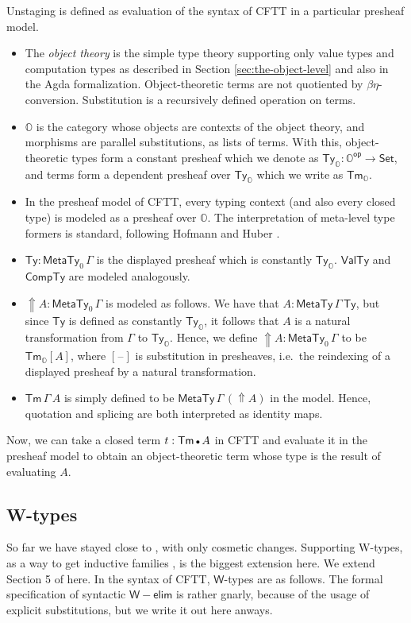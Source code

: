 \documentclass[acmsmall,screen,review,anonymous]{acmart}
\newcommand{\msf}[1]{{\mathsf{#1}}}
\newcommand{\mbb}[1]{\mathbb{#1}}
\newcommand{\emptycon}{\scaleobj{.75}\bullet}
\newcommand{\Tyo}{\msf{Ty}_{\mbbo}}
\newcommand{\Tmo}{\msf{Tm}_{\mbbo}}
\newcommand{\mbbo}{\mbb{O}}
\newcommand{\vW}{\mathsf{W}}
\newcommand{\Set}{\msf{Set}}
\newcommand{\Tm}{\msf{Tm}}
\newcommand{\Lift}{{\Uparrow}}
\newcommand{\MTy}{\msf{MetaTy}}
\newcommand{\VTy}{\msf{ValTy}}
\newcommand{\Ty}{\msf{Ty}}
\newcommand{\CTy}{\msf{CompTy}}
\newcommand{\blank}{{\mathord{\hspace{1pt}\text{--}\hspace{1pt}}}}
\theoremstyle{remark}
\begin{document}
Unstaging is defined as evaluation of the syntax of CFTT in a particular
presheaf model.
\begin{itemize}
  \item The \emph{object theory} is the simple type theory supporting only value
    types and computation types as described in Section
    \ref{sec:the-object-level} and also in the Agda
    formalization. Object-theoretic terms are not quotiented by
    $\beta\eta$-conversion. Substitution is a recursively defined operation on
    terms.
  \item $\mbbo$ is the category whose objects are contexts of the object theory,
    and morphisms are parallel substitutions, as lists of terms. With this,
    object-theoretic types form a constant presheaf which we denote
    as $\Tyo : \mbbo^{\msf{op}} \to \Set$, and terms form a dependent presheaf over $\Tyo$ which we write as
    $\Tmo$.
  \item
  In the presheaf model of CFTT, every typing context (and also every closed
  type) is modeled as a presheaf over $\mbbo$. The interpretation of meta-level
  type formers is standard, following Hofmann \cite{Hofmann97syntaxand} and
  Huber \cite{huber-thesis}.
\item $\Ty : \MTy_0\,\Gamma$ is the displayed presheaf which is constantly
  $\Tyo$. $\VTy$ and $\CTy$ are modeled analogously.
\item $\Lift A : \MTy_0\,\Gamma$ is modeled as follows. We have that $A :
  \MTy\,\Gamma\,\Ty$, but since $\Ty$ is defined as constantly $\Tyo$, it
  follows that $A$ is a natural transformation from $\Gamma$ to $\Tyo$. Hence,
  we define $\Lift A : \MTy_0\,\Gamma$ to be $\Tmo[A]$, where $[\blank]$ is
  substitution in presheaves, i.e.\ the reindexing of a displayed presheaf by a
  natural transformation.
\item
  $\Tm\,\Gamma\,A$ is simply defined to be $\MTy\,\Gamma\,(\Lift A)$ in the model. Hence,
  quotation and splicing are both interpreted as identity maps.
\end{itemize}
Now, we can take a closed term $t : \Tm\,\emptycon\,A$ in CFTT and evaluate it
in the presheaf model to obtain an object-theoretic term whose type is the
result of evaluating $A$.

\subsection{W-types}
So far we have stayed close to \cite{staged2ltt}, with only cosmetic
changes. Supporting W-types, as a way to get inductive families \cite{TODO}, is
the biggest extension here. We extend Section 5 of \cite{staged2ltt} here. In
the syntax of CFTT, $\vW$-types are as follows. The formal specification of
syntactic $\vW{-}\msf{elim}$ is rather gnarly, because of the usage of explicit
substitutions, but we write it out here anways.
\end{document}
